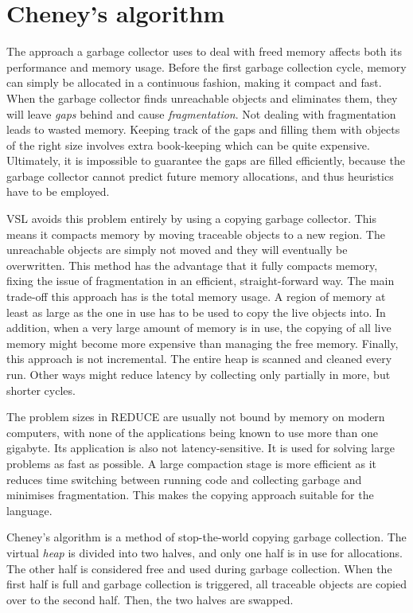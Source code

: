 \section{Cheney's algorithm}
The approach a garbage collector uses to deal with freed memory affects both its performance and memory usage.
Before the first garbage collection cycle, memory can simply be allocated in a continuous fashion, making it
compact and fast. When the garbage collector finds unreachable objects and eliminates them, they will leave \emph{gaps} behind
and cause \emph{fragmentation}. Not dealing with fragmentation leads to wasted memory. Keeping track of the gaps
and filling them with objects of the right size involves extra book-keeping which can be quite expensive. Ultimately,
it is impossible to guarantee the gaps are filled efficiently, because the garbage collector cannot predict future
memory allocations, and thus heuristics have to be employed.

VSL avoids this problem entirely by using a copying garbage collector. This means it compacts memory by moving
traceable objects to a new region. The unreachable objects are simply not moved and they will eventually be overwritten.
This method has the advantage that it fully compacts memory, fixing the issue of fragmentation in an efficient,
straight-forward way. The main trade-off this approach has is the total memory usage. A region of memory at least
as large as the one in use has to be used to copy the live objects into. In addition, when a very large amount
of memory is in use, the copying of all live memory might become more expensive than managing the free memory.
Finally, this approach is not incremental. The entire heap is scanned and cleaned every run. Other ways might
reduce latency by collecting only partially in more, but shorter cycles.

The problem sizes in REDUCE are usually not bound by memory on modern computers, with none of the applications
being known to use more than one gigabyte. Its application is also not latency-sensitive. It is used for
solving large problems as fast as possible. A large compaction stage is more efficient as it reduces time
switching between running code and collecting garbage and minimises fragmentation.
This makes the copying approach suitable for the language.

Cheney's algorithm \cite{cheney} is a method of stop-the-world copying garbage collection. The virtual \emph{heap} is divided into
two halves, and only one half is in use for allocations. The other half is considered free and used during garbage
collection. When the first half is full and garbage collection is triggered, all traceable objects are copied over
to the second half. Then, the two halves are swapped.

